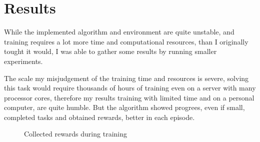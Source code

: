 \documentclass{article}
\begin{document}
\section{Results}
	While the implemented algorithm and environment are quite unstable, and training requires a lot more time and computational resources, than I originally tought it would, I was able to gather some results by running smaller experiments.

	The scale my misjudgement of the training time and resources is severe, solving this task would require thousands of hours of training even on a server with many processor cores, therefore my results training with limited time and on a personal computer, are quite humble. But the algorithm showed progrees, even if small, completed tasks and obtained rewards, better in each episode.
\begin{figure}%
    \centering
    \label{fig:rewards-over-runs}%
\end{figure}

\begin{figure}%
    \centering
    \caption{Collected rewards during training}%
    \label{fig:rewards}%
\end{figure}
\end{document}
